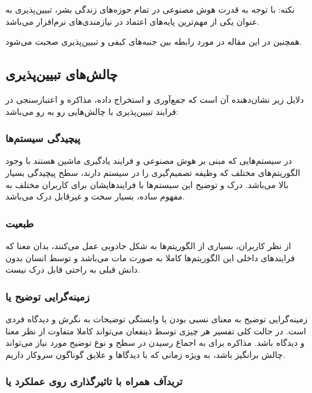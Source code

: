 نکته: با توجه به قدرت هوش مصنوعی در تمام حوزه‌های زندگی بشر، تبیین‌پذیری به
عنوان یکی از مهم‌ترین پایه‌های اعتماد در نیازمندی‌های نرم‌افزار می‌باشد.


همچنین در این مقاله در مورد رابطه بین جنبه‌های کیفی و تبیین‌پذیری صحبت می‌شود.

\subsection{چالش‌های تبیین‌پذیری}

دلایل زیر نشان‌دهنده آن است که جمع‌آوری و استخراج داده، مذاکره و اعتبارسنجی در
فرایند تبیین‌پذیری با چالش‌هایی رو به رو می‌باشد:

\subsubsection{پیچیدگی سیستم‌ها}

در سیستم‌هایی که مبنی بر هوش مصنوعی و فرایند یادگیری ماشین هستند با وجود
الگوریتم‌های مختلف که وظیفه تصمیم‌گیری را در سیستم دارند، سطح پیچیدگی بسیار بالا
می‌باشد. درک و توضیح این سیستم‌ها با فرایند‌هایشان برای کاربران مختلف به مفهوم
ساده، بسیار سخت و غیرقابل درک می‌باشد.

\subsubsection{طبعیت }

از نظر کاربران، بسیاری از الگوریتم‌ها به شکل جادویی عمل می‌کنند، بدان معنا که
فرایند‌های داخلی این الگوریتم‌ها کاملا به صورت مات می‌باشد و توسط انسان بدون
دانش قبلی به راحتی قابل درک نیست.

\subsubsection{زمینه‌گرایی توضیح یا }

زمینه‌گرایی توضیح به معنای نسبی بودن یا وابستگی توضیحات به نگرش و دیدگاه فردی
است. در حالت کلی تفسیر هر چیزی توسط ذینفعان می‌تواند کاملا متفاوت از نظر معنا و
دیدگاه باشد. مذاکره برای به اجماع رسیدن در سطح و نوع توضیح مورد نیاز می‌تواند
چالش برانگیز باشد، به ویژه زمانی که با دیدگاها و علایق گوناگون سروکار داریم.

\subsubsection{تریدآف همراه با تاثیرگذاری روی عملکرد یا }

